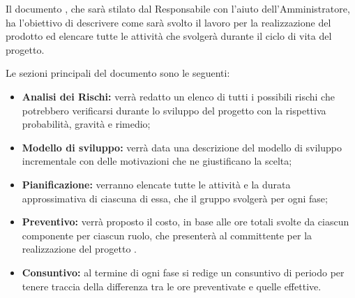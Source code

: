 Il documento \PdP, che sarà stilato dal Responsabile con l'aiuto dell'Amministratore, ha l'obiettivo di descrivere come sarà svolto il lavoro per la realizzazione del prodotto ed elencare tutte le attività che \Gruppo{} svolgerà durante il ciclo di vita del progetto.


Le sezioni principali del documento sono le seguenti:
\begin{itemize}
	\item \textbf{Analisi dei Rischi:} verrà redatto un elenco di tutti i possibili rischi che potrebbero verificarsi durante lo sviluppo del progetto con la rispettiva probabilità, gravità e rimedio;
	\item \textbf{Modello di sviluppo:} verrà data una descrizione del modello di sviluppo incrementale con delle motivazioni che ne giustificano la scelta;
	\item \textbf{Pianificazione:} verranno elencate tutte le attività e la durata approssimativa di ciascuna di essa, che il gruppo svolgerà per ogni fase;
	\item \textbf{Preventivo:} verrà proposto il costo, in base alle ore totali svolte da ciascun componente per ciascun ruolo, che \Gruppo{} presenterà al committente per la realizzazione del progetto \NomeProgetto{}.
	\item \textbf{Consuntivo:} al termine di ogni fase si redige un consuntivo di periodo per tenere traccia della differenza tra le ore preventivate e quelle effettive.
\end{itemize}